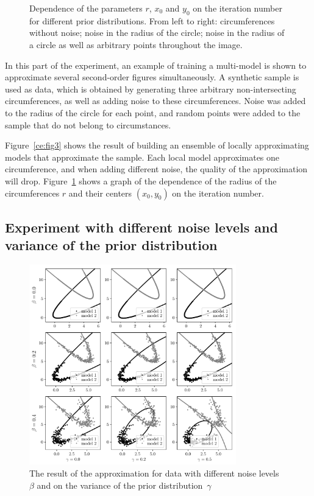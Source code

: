 \documentclass[12pt, twoside]{article}
\numberwithin{equation}{section}
\begin{document}
\begin{figure}[h]
\begin{minipage}{.32\textwidth}
\end{minipage}
\caption{Dependence of the parameters  $r$, $x_0$ and $y_0$ on the iteration number for different prior distributions. From left to right: circumferences without noise; noise in the radius of the circle; noise in the radius of a circle as well as arbitrary points throughout the image.}
\label{ce:fig4}
\end{figure}

In this part of the experiment, an example of training a multi-model is shown to approximate several second-order figures simultaneously. A synthetic sample is used as data, which is obtained by generating three arbitrary non-intersecting circumferences, as well as adding noise to these circumferences. Noise was added to the radius of the circle for each point, and random points were added to the sample that do not belong to circumstances.

Figure~\ref{ce:fig3} shows the result of building an ensemble of locally approximating models that approximate the sample. Each local model approximates one circumference, and when adding different noise, the quality of the approximation will drop.
Figure~\ref{ce:fig4} shows a graph of the dependence of the radius of the circumferences $r$ and their centers $(x_0, y_0)$ on the iteration number. 

\subsection{ Experiment with different noise levels and variance of the prior distribution }
\begin{figure}[h!t]\center
\includegraphics[width=0.8\textwidth]{figures/beta_gamma}
\caption{ The result of the approximation for data with different noise levels~$\beta$ and on the variance of the prior distribution~$\gamma$}
\label{ce:fig6}
\end{figure}
\end{document}
